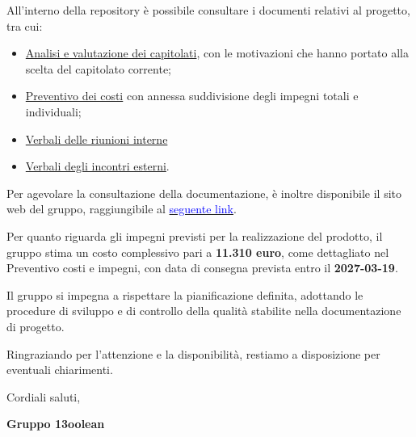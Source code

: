 \documentclass[11pt,a4paper]{article}
\begin{document}
All'interno della repository è possibile consultare i documenti
relativi al progetto, tra cui:

\begin{itemize}[leftmargin=*]
    \item \href{https://13oolean-documentazione.vercel.app/documenti/Candidatura/Valutazione%20dei%20capitolati/valutazione_capitolati.pdf}{Analisi e valutazione dei capitolati}, con le motivazioni
    che hanno portato alla scelta del capitolato corrente;
    \item \href{https://13oolean-documentazione.vercel.app/documenti/Candidatura/Preventivo%20costi%20e%20impegni/preventivo_costi_e_impegni.pdf}{Preventivo dei costi} con annessa suddivisione degli impegni totali e individuali;
    \item \href{https://13oolean-documentazione.vercel.app/documenti/Verbali/Verbali%20interni}{Verbali delle riunioni interne}
	\item \href{https://13oolean-documentazione.vercel.app/documenti/Verbali/Verbali%20esterni}{Verbali degli incontri esterni}.
\end{itemize}

Per agevolare la consultazione della documentazione, è inoltre disponibile il sito web del gruppo, raggiungibile al \href{https://13oolean-documentazione.vercel.app/}{\textcolor{blue}{seguente link}}.


Per quanto riguarda gli impegni previsti per la realizzazione del
prodotto, il gruppo stima un costo complessivo pari a
\textbf{11.310 euro}, come dettagliato nel Preventivo costi e impegni, con data di consegna prevista entro il
\textbf{2027-03-19}.


Il gruppo si impegna a rispettare la pianificazione definita,
adottando le procedure di sviluppo e di controllo della qualità
stabilite nella documentazione di progetto.


Ringraziando per l'attenzione e la disponibilità, restiamo a
disposizione per eventuali chiarimenti.

\medskip

Cordiali saluti,

\medskip

\noindent
\textbf{Gruppo 13oolean}\\
\end{document}
